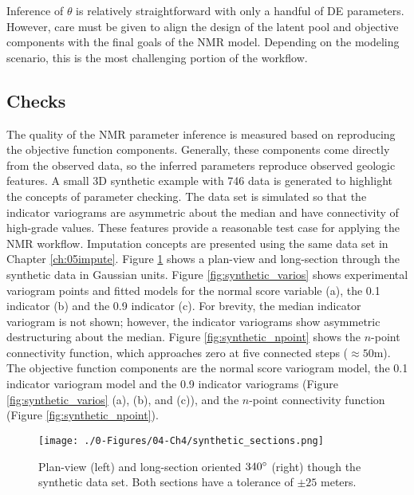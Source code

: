 Inference of $\theta$ is relatively straightforward with only a handful of \gls{DE} parameters. However, care must be given to align the design of the latent pool and objective components with the final goals of the \gls{NMR} model. Depending on the modeling scenario, this is the most challenging portion of the workflow.

\subsection{Checks}
\label{subsec:04checks}

The quality of the \gls{NMR} parameter inference is measured based on reproducing the objective function components. Generally, these components come directly from the observed data, so the inferred parameters reproduce observed geologic features. A small \gls{3D} synthetic example with 746 data is generated to highlight the concepts of parameter checking. The data set is simulated so that the indicator variograms are asymmetric about the median and have connectivity of high-grade values. These features provide a reasonable test case for applying the \gls{NMR} workflow. Imputation concepts are presented using the same data set in Chapter \ref{ch:05impute}. Figure \ref{fig:synthetic_sections} shows a plan-view and long-section through the synthetic data in Gaussian units. Figure \ref{fig:synthetic_varios} shows experimental variogram points and fitted models for the normal score variable (a), the 0.1 indicator (b) and the 0.9 indicator (c). For brevity, the median indicator variogram is not shown; however, the indicator variograms show asymmetric destructuring about the median. Figure \ref{fig:synthetic_npoint} shows the $n$-point connectivity function, which approaches zero at five connected steps ($\approx 50$m). The objective function components are the normal score variogram model, the 0.1 indicator variogram model and the 0.9 indicator variograms (Figure \ref{fig:synthetic_varios} (a), (b), and (c)), and the $n$-point connectivity function (Figure \ref{fig:synthetic_npoint}).

\begin{figure}[htb!]
    \centering
    \texttt{[image: ./0-Figures/04-Ch4/synthetic\_sections.png]}
    \caption{Plan-view (left) and long-section oriented $340\degree$ (right) though the synthetic data set. Both sections have a tolerance of $\pm25$ meters.}
    \label{fig:synthetic_sections}
\end{figure}

